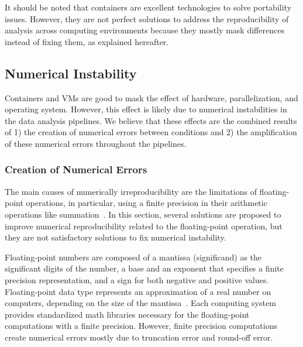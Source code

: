 It should be noted that containers are excellent technologies to solve 
portability issues. However, they are not perfect solutions to address 
the reproducibility of analysis across computing environments because 
they mostly mask differences instead of fixing them, as explained hereafter.

\subsection{Numerical Instability}

Containers and VMs are good to mask the effect of hardware, 
parallelization, and operating system. However, this effect is likely due to 
numerical instabilities in the data analysis 
pipelines. We believe that these effects are the combined results of 1) 
the creation of numerical errors between conditions and 2) the 
amplification of these numerical errors throughout the pipelines. 

\subsubsection{Creation of Numerical Errors}

The main causes of numerically irreproducibility are the limitations of 
floating-point operations, in particular, using a finite precision in 
their arithmetic operations like summation~\cite{hill2017numerical, 
taufer2010improving}. In this section, several solutions are proposed 
to improve numerical reproducibility related to the floating-point 
operation, but they are not satisfactory solutions to fix numerical instability. 

Floating-point numbers are composed of a mantissa (significand) as the 
significant digits of the number, a base and an exponent that specifies 
a finite precision representation, and a sign for both negative and positive 
values. Floating-point data type represents an approximation of a real 
number on computers, depending on the size of the 
mantissa~\cite{hill2017numerical}. Each computing system provides 
standardized math libraries necessary for the floating-point 
computations with a finite precision. However, finite precision 
computations create numerical errors mostly due to truncation error and 
round-off error. 

